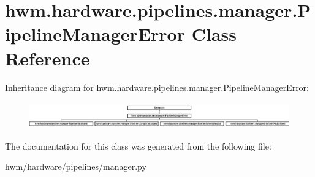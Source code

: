 \hypertarget{classhwm_1_1hardware_1_1pipelines_1_1manager_1_1_pipeline_manager_error}{\section{hwm.\-hardware.\-pipelines.\-manager.\-Pipeline\-Manager\-Error Class Reference}
\label{classhwm_1_1hardware_1_1pipelines_1_1manager_1_1_pipeline_manager_error}
}
Inheritance diagram for hwm.\-hardware.\-pipelines.\-manager.\-Pipeline\-Manager\-Error\-:\begin{figure}[H]
\begin{center}
\leavevmode
\includegraphics[height=1.160221cm]{classhwm_1_1hardware_1_1pipelines_1_1manager_1_1_pipeline_manager_error}
\end{center}
\end{figure}


The documentation for this class was generated from the following file\-:\begin{DoxyCompactItemize}
\item 
hwm/hardware/pipelines/manager.\-py\end{DoxyCompactItemize}
